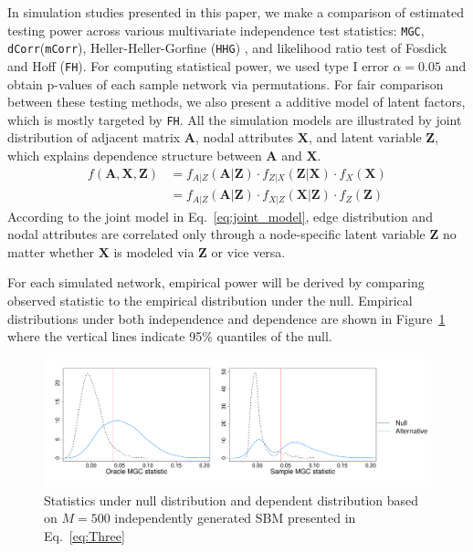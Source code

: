 \documentclass[12pt]{article}
\theoremstyle{definition}
\begin{document}
In simulation studies presented in this paper, we make a comparison of estimated testing power across various multivariate independence test statistics: \texttt{MGC}, \texttt{dCorr}(\texttt{mCorr}), Heller-Heller-Gorfine (\texttt{HHG}) \citep{heller2012consistent}, and likelihood ratio test of Fosdick and Hoff (\texttt{FH}). For computing statistical power, we used type I error $\alpha = 0.05$ and obtain p-values of each sample network via permutations. For fair comparison between these testing methods, we also present a additive model of latent factors, which is mostly targeted by \texttt{FH}.  All the simulation models are illustrated by joint distribution of adjacent matrix $\mathbf{A}$, nodal attributes $\mathbf{X}$, and latent variable $\mathbf{Z}$, which explains dependence structure between $\mathbf{A}$ and $\mathbf{X}$. 
\begin{equation}
\begin{split}
f(\mathbf{A}, \mathbf{X}, \mathbf{Z}) & = f_{A | Z}(\mathbf{A} | \mathbf{Z}) \cdot f_{Z | X}(\mathbf{Z} | \mathbf{X}) \cdot f_{X}(\mathbf{X}) 
\\ & = f_{A | Z}(\mathbf{A} | \mathbf{Z}) \cdot  f_{X | Z}(\mathbf{X} | \mathbf{Z} ) \cdot f_{Z} (\mathbf{Z}) 
\end{split}
\label{eq:joint_model}
\end{equation}	
According to the joint model in Eq.~\ref{eq:joint_model}, edge distribution and nodal attributes are correlated only through a node-specific latent variable $\mathbf{Z}$ no matter whether $\mathbf{X}$ is modeled via $\mathbf{Z}$ or vice versa. 

For each simulated network, empirical power will be derived by comparing observed statistic to the empirical distribution under the null. Empirical distributions under both independence and dependence are shown in Figure~\ref{fig:density} where the vertical lines indicate 95$\%$ quantiles of the null.
\begin{figure}[H]
	\centering
	\includegraphics[width=5in]{../Figure/density.pdf}
	\caption{Statistics under null distribution and dependent distribution based on $M = 500$ independently generated SBM presented in Eq.~\ref{eq:Three}}
	\label{fig:density}
\end{figure}		
						
\end{document}
